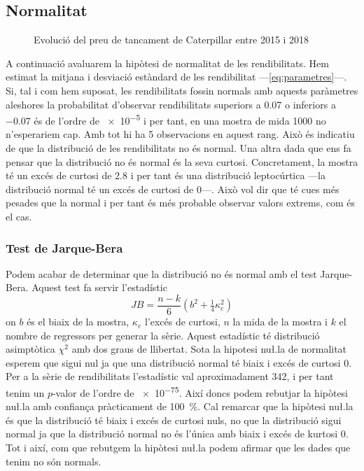 \documentclass{article}
\numberwithin{table}{section}
\numberwithin{figure}{section}
\numberwithin{equation}{section}
\begin{document}
\subsection{Normalitat}
\begin{figure}[H]
	\centering \sffamily \small
	
	\caption{Evolució del preu de tancament de Caterpillar entre 2015 i 2018}
	\label{fig:distribucio rendibilitats}
\end{figure}
A continuació avaluarem la hipòtesi de normalitat de les rendibilitats. Hem estimat la mitjana i desviació estàndard de les rendibilitat ---\cref{eq:parametres}---. Si, tal i com hem suposat, les rendibilitats fossin normals amb aquests paràmetres aleshores la probabilitat d'observar rendibilitats superiors a \num{0.07} o inferiors a \num{-0.07} és de l'ordre de \num{e-5} i per tant, en una mostra de mida 1000 no n'esperariem cap. Amb tot hi ha 5 observacions en aquest rang. Això és indicatiu de que la distribució de les rendibilitats no és normal. Una altra dada que ens fa pensar que la distribució no és normal és la seva curtosi. Concretament, la mostra té un excés de curtosi de \num{2.8} i per tant és una distribució leptocúrtica ---la distribució normal té un excés de curtosi de 0---. Això vol dir que té cues més pesades que la normal i per tant és més probable observar valors extrems, com és el cas. 

\subsubsection{Test de Jarque-Bera}
Podem acabar de determinar que la distribució no és normal amb el test Jarque-Bera. Aquest test fa servir l'estadístic
\begin{equation} \label{eqn:jarque-bera}
	JB = \frac{n-k}{6}\left(b^2 + \tfrac{1}{4}\kappa_e^2\right)
\end{equation}
on \( b \) és el biaix de la mostra, \( \kappa_e \) l'excés de curtosi, \( n \) la mida de la mostra i \( k \) el nombre de regressors per generar la sèrie. Aquest estadístic té distribució asimptòtica \( \chi^2 \) amb dos graus de llibertat. Sota la hipotesi nu\l.la de normalitat esperem que sigui nul ja que una distribució normal té biaix i excés de curtosi 0. Per a la sèrie de rendibilitats l'estadístic val aproximadament \num{342}, i per tant tenim un \( p \)-valor de l'ordre de \num{e-75}. Així doncs podem rebutjar la hipòtesi nu\l.la amb confiança pràcticament de \SI{100}{\percent}. Cal remarcar que la hipòtesi nu\l.la és que la distribució té biaix i excés de curtosi nuls, no que la distribució sigui normal ja que la distribució normal no és l'única amb biaix i excés de kurtosi 0. Tot i així, com que rebutgem la hipòtesi nu\l.la podem afirmar que les dades que tenim no són normals. 
\end{document}
